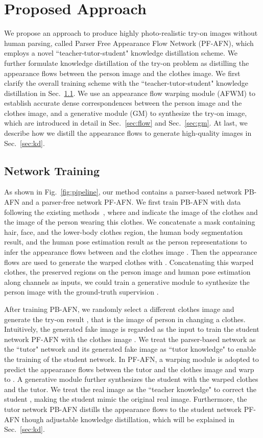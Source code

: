 \documentclass[final]{cvpr}
\begin{document}
	
\section{Proposed Approach}
We propose an approach to produce highly photo-realistic try-on images without human parsing, called Parser Free Appearance Flow Network (PF-AFN), which employs a novel ``teacher-tutor-student" knowledge distillation scheme.
We further formulate knowledge distillation of the try-on problem as distilling the appearance flows between the person image and the clothes image.
We first clarify the overall training scheme with the ``teacher-tutor-student" knowledge distillation in Sec.~\ref{sec:pipeline}. 
We use an appearance flow warping module (AFWM) to establish accurate dense correspondences between the person image and the clothes image, and a generative module (GM) to synthesize the try-on image, which are introduced in detail in Sec.~\ref{sec:flow} and Sec.~\ref{sec:gm}.
At last, we describe how we distill the appearance flows to generate high-quality images in Sec.~\ref{sec:kd}.
	
	
	\subsection{Network Training} \label{sec:pipeline}
	As shown in Fig.~\ref{fig:pipeline}, our method contains a parser-based network PB-AFN and a parser-free network PF-AFN.
We first train PB-AFN with data   following the existing methods~\cite{cpvton,clothflow,ACGPN}, where  and  indicate the image of the clothes and the image of the person wearing this clothes. 
We concatenate a mask containing hair, face, and the lower-body clothes region, the human body segmentation result, and the human pose estimation result as the person representations  to infer the appearance flows  between  and the clothes image .
Then the appearance flows  are used to generate the warped clothes  with .
Concatenating this warped clothes, the preserved regions on the person image and human pose estimation along channels as inputs, we could train a generative module to synthesize the person image with the ground-truth supervision .
	
After training PB-AFN, we randomly select a different clothes image  and generate the try-on result , that is the image of person in  changing a clothes.
Intuitively, the generated fake image  is regarded as the input to train the student network PF-AFN with the clothes image .
We treat the parser-based network as the ``tutor" network and its generated fake image as ``tutor knowledge" to enable the training of the student network.
In PF-AFN, a warping module is adopted to predict the appearance flows  between the tutor  and the clothes image  and warp  to .
A generative module further synthesizes the student  with the warped clothes and the tutor.
We treat the real image  as the ``teacher knowledge" to correct the student , making the student mimic the original real image.
Furthermore, the tutor network PB-AFN distills the appearance flows  to the student network PF-AFN though adjustable knowledge distillation, which will be explained in Sec.~\ref{sec:kd}.	
	
\end{document}
